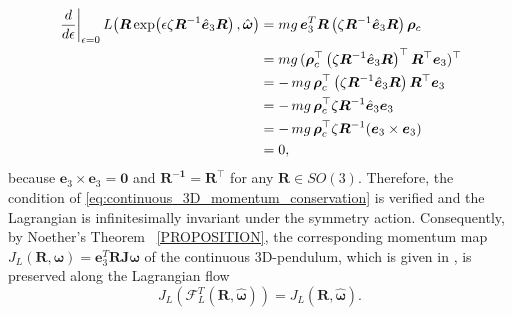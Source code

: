 \begin{align}
\left.\frac{d}{d\epsilon}\right|_{\epsilon=0}
L\!\left(\bm{R}\exp\!\left(\epsilon \zeta \bm{R}^{-1}\hat{\bm{e}}_3\bm{R}\right),\hat{\bm{\omega}}\right)
&=
mg\,\bm{e}_3^T\bm{R}
\left(\zeta \bm{R}^{-1}\hat{\bm{e}}_3\bm{R}\right)
\bm{\rho}_c \notag\\
&=
mg\,(\bm{\rho}_c^\top
\left(\zeta \bm{R}^{-1}\hat{\bm{e}}_3\bm{R}\right)^\top
\bm{R}^\top\bm{e}_3)^\top \notag\\
&=
-\,mg\,\bm{\rho}_c^\top
\left(\zeta \bm{R}^{-1}\hat{\bm{e}}_3\bm{R}\right)
\bm{R}^\top\bm{e}_3 \notag\\
&=
-\,mg\,\bm{\rho}_c^\top
\zeta \bm{R}^{-1}\hat{\bm{e}}_3\bm{e}_3 \notag\\
&=
-\,mg\,\bm{\rho}_c^\top
\zeta \bm{R}^{-1}(\bm{e}_3\times \bm{e}_3) \notag\\
&=0,
\end{align}
because $\bm{e}_3\times \bm{e}_3=\bm{0}$ and $\bm{R^{-1}}=\bm{R^\top}$ for any $\bm{R} \in SO(3)$. Therefore, the condition of \eqref{eq:continuous_3D_momentum_conservation} is verified and the Lagrangian is infinitesimally invariant under the symmetry action. Consequently, by Noether's Theorem ~\ref{PROPOSITION}, the corresponding momentum map $J_L(\bm{R},\bm{\omega}) = \bm{e}_3^T \bm{R}\bm{J}\bm{\omega}$ of the continuous 3D-pendulum, which is given in \cite{Lee2008}, is preserved along the Lagrangian flow
\[  J_L\!\left(\mathcal{F}_L^T(\bm{R},\hat{\bm{\omega}})\right)
    =
    J_L(\bm{R},\hat{\bm{\omega}}).
\]

